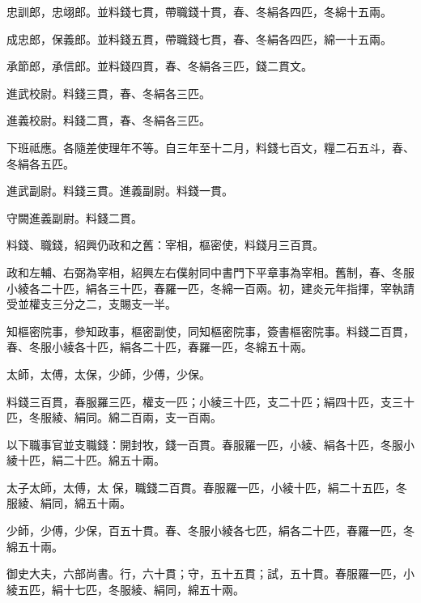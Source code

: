 \begin{pinyinscope}
 忠訓郎，忠翊郎。並料錢七貫，帶職錢十貫，春、冬絹各四匹，冬綿十五兩。



 成忠郎，保義郎。並料錢五貫，帶職錢七貫，春、冬絹各四匹，綿一十五兩。



 承節郎，承信郎。並料錢四貫，春、冬絹各三匹，錢二貫文。



 進武校尉。料錢三貫，春、冬絹各三匹。



 進義校尉。料錢二貫，春、冬絹各三匹。



 下班祗應。各隨差使理年不等。自三年至十二月，料錢七百文，糧二石五斗，春、冬絹各五匹。



 進武副尉。料錢三貫。進義副尉。料錢一貫。



 守闕進義副尉。料錢二貫。



 料錢、職錢，紹興仍政和之舊：宰相，樞密使，料錢月三百貫。



 政和左輔、右弼為宰相，紹興左右僕射同中書門下平章事為宰相。舊制，春、冬服小綾各二十匹，絹各三十匹，春羅一匹，冬綿一百兩。初，建炎元年指揮，宰執請受並權支三分之二，支賜支一半。



 知樞密院事，參知政事，樞密副使，同知樞密院事，簽書樞密院事。料錢二百貫，春、冬服小綾各十匹，絹各二十匹，春羅一匹，冬綿五十兩。



 太師，太傅，太保，少師，少傅，少保。



 料錢三百貫，春服羅三匹，權支一匹；小綾三十匹，支二十匹；絹四十匹，支三十匹，冬服綾、絹同。綿二百兩，支一百兩。



 以下職事官並支職錢：開封牧，錢一百貫。春服羅一匹，小綾、絹各十匹，冬服小綾十匹，絹二十匹。綿五十兩。



 太子太師，太傅，太
 保，職錢二百貫。春服羅一匹，小綾十匹，絹二十五匹，冬服綾、絹同，綿五十兩。



 少師，少傅，少保，百五十貫。春、冬服小綾各七匹，絹各二十匹，春羅一匹，冬綿五十兩。



 御史大夫，六部尚書。行，六十貫；守，五十五貫；試，五十貫。春服羅一匹，小綾五匹，絹十七匹，冬服綾、絹同，綿五十兩。




\end{pinyinscope}
